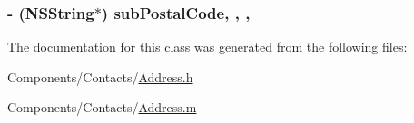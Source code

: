 \hypertarget{interface_address_a93d53fa65fc90ec08e491c2d285f10e8}{
\subsubsection[{sub\-Postal\-Code}]{\setlength{\rightskip}{0pt plus 5cm}-\/ (N\-S\-String$\ast$) sub\-Postal\-Code\hspace{0.3cm}{\ttfamily [read]}, {\ttfamily [write]}, {\ttfamily [nonatomic]}, {\ttfamily [strong]}}}\label{interface_address_a93d53fa65fc90ec08e491c2d285f10e8}


The documentation for this class was generated from the following files\-:\begin{DoxyCompactItemize}
\item 
Components/\-Contacts/\hyperlink{_address_8h}{Address.\-h}\item 
Components/\-Contacts/\hyperlink{_address_8m}{Address.\-m}\end{DoxyCompactItemize}
